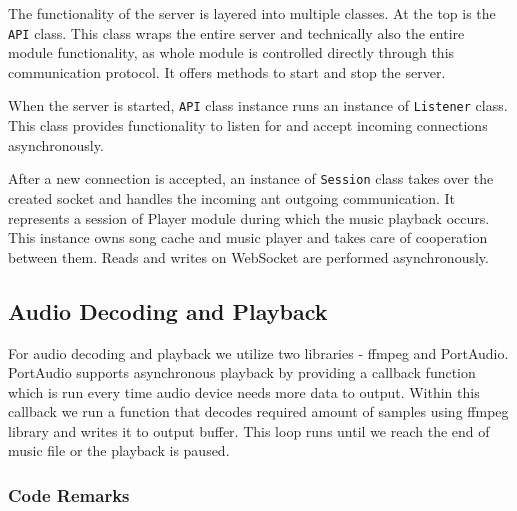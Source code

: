 The functionality of the server is layered into multiple classes. At the top is the \texttt{API} class. This class wraps the entire server and technically also the entire module functionality, as whole module is controlled directly through this communication protocol. It offers methods to start and stop the server.
\par
When the server is started, \texttt{API} class instance runs an instance of \texttt{Listener} class. This class provides functionality to listen for and accept incoming connections asynchronously.
\par
After a new connection is accepted, an instance of \texttt{Session} class takes over the created socket and handles the incoming ant outgoing communication. It represents a session of Player module during which the music playback occurs. This instance owns song cache and music player and takes care of cooperation between them. Reads and writes on WebSocket are performed asynchronously. 

\subsection{Audio Decoding and Playback}

For audio decoding and playback we utilize two libraries - ffmpeg and PortAudio. PortAudio supports asynchronous playback by providing a callback function which is run every time audio device needs more data to output. Within this callback we run a function that decodes required amount of samples using ffmpeg library and writes it to output buffer. This loop runs until we reach the end of music file or the playback is paused.

\subsubsection{Code Remarks}

